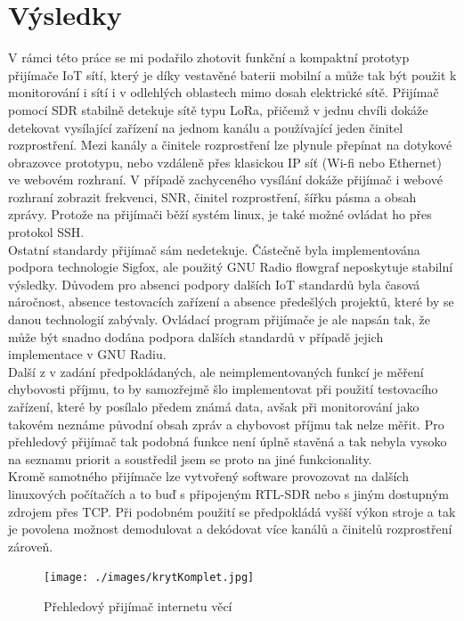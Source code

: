 \documentclass{ctuthesis}
\begin{document}
\section{Výsledky}
V rámci této práce se mi podařilo zhotovit funkční a kompaktní prototyp přijímače IoT sítí, který je díky vestavěné baterii mobilní a může tak být použit k monitorování i sítí i v odlehlých oblastech mimo dosah elektrické sítě. Přijímač pomocí SDR stabilně detekuje sítě typu LoRa, přičemž v jednu chvíli dokáže detekovat vysílající zařízení na jednom kanálu a používající jeden činitel rozprostření. Mezi kanály a činitele rozprostření lze plynule přepínat na dotykové obrazovce prototypu, nebo vzdáleně přes klasickou IP síť (Wi-fi nebo Ethernet) ve webovém rozhraní. V případě zachyceného vysílání dokáže přijímač i webové rozhraní zobrazit frekvenci, SNR, činitel rozprostření, šířku pásma a obsah zprávy. Protože na přijímači běží systém linux, je také možné ovládat ho přes protokol SSH.\\
Ostatní standardy přijímač sám nedetekuje. Částečně byla implementována podpora technologie Sigfox, ale použitý GNU Radio flowgraf neposkytuje stabilní výsledky. Důvodem pro absenci podpory dalších IoT standardů byla časová náročnost, absence testovacích zařízení a absence předešlých projektů, které by se danou technologií zabývaly. Ovládací program přijímače je ale napsán tak, že může být snadno dodána podpora dalších standardů v případě jejich implementace v GNU Radiu.\\
Další z v zadání předpokládaných, ale neimplementovaných funkcí je měření chybovosti příjmu, to by samozřejmě šlo implementovat při použití testovacího zařízení, které by posílalo předem známá data, avšak při monitorování jako takovém neznáme původní obsah zpráv a chybovost příjmu tak nelze měřit. Pro přehledový přijímač tak podobná funkce není úplně stavěná a tak nebyla vysoko na seznamu priorit a soustředil jsem se proto na jiné funkcionality.\\
Kromě samotného přijímače lze vytvořený software provozovat na dalších linuxových počítačích a to buď s připojeným RTL-SDR nebo s jiným dostupným zdrojem přes TCP. Při podobném použití se předpokládá vyšší výkon stroje a tak je povolena možnost demodulovat a dekódovat více kanálů a činitelů rozprostření zároveň.

\begin{figure}
\caption{Přehledový přijímač internetu věcí}
\texttt{[image: ./images/krytKomplet.jpg]}
\label{caseKomplet}
\end{figure}
\end{document}
